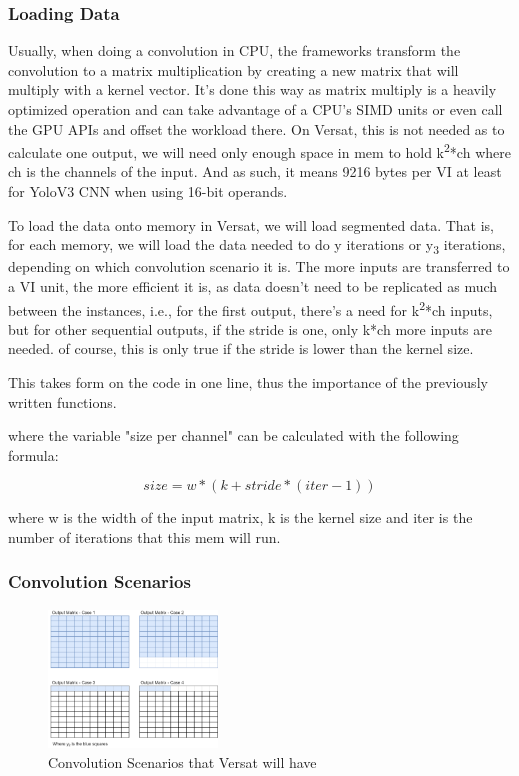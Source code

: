 \documentclass[conference]{IEEEtran}
\begin{document}
\subsubsection{Loading Data}

Usually, when doing a convolution in CPU, the frameworks transform the convolution to a matrix multiplication by creating a new matrix that will multiply with a
kernel vector. It's done this way as matrix multiply is a heavily optimized operation and can take advantage of a CPU's SIMD units or even call the GPU APIs
and offset the workload there. On Versat, this is not needed as to calculate one output, we will need only enough space in mem to hold
k\textsuperscript{2}*ch where ch is the channels of the input. And as such, it means 9216 bytes per VI at least for YoloV3 CNN when using 16-bit operands.

To load the data onto memory in Versat, we will load segmented data. That is, for each memory, we will load the data
needed to do y iterations or y\textsubscript{3} iterations, depending on which convolution scenario it is.
The more inputs are transferred to a VI unit, the more efficient it is, as data doesn't need to be replicated as much between the instances,
i.e., for the first output, there's a need for k\textsuperscript{2}*ch inputs, but for other sequential outputs, if the stride is one, only k*ch more inputs are needed.
of course, this is only true if the stride is lower than the kernel size.

This takes form on the code in one line, thus the importance of the previously written functions.



where the variable "size per channel" can be calculated with the following formula:

\[ size=w*(k+stride*(iter-1)) \]

where w is the width of the input matrix, k is the kernel size and iter is the number of iterations that this mem will run.

\subsubsection{Convolution Scenarios}
\label{ConvolutionScenarios}

\begin{figure}[!htbp]
    \centering
    \includegraphics[width=0.4\textwidth]{Figures/Variables.drawio.png}
    \caption{Convolution Scenarios that Versat will have}
    \label{ConvScenarioss}
\end{figure}
\end{document}
